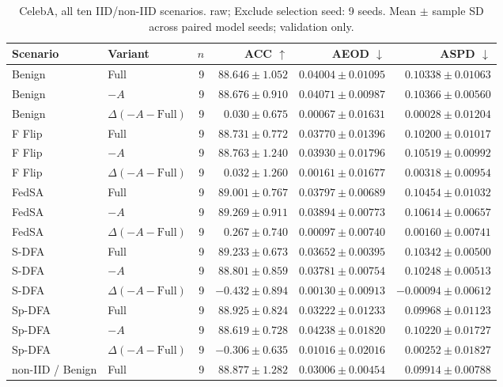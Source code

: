 \begin{table}[t]
\centering
\small
\caption{CelebA, all ten IID/non-IID scenarios. raw; Exclude selection seed: 9 seeds. Mean $\pm$ sample SD across paired model seeds; validation only.}
\begin{tabular}{llrrrr}
\toprule
Scenario & Variant & $n$ & ACC $\uparrow$ & AEOD $\downarrow$ & ASPD $\downarrow$ \\
\midrule
Benign & Full & 9 & $88.646 \pm 1.052$ & $0.04004 \pm 0.01095$ & $0.10338 \pm 0.01063$ \\
Benign & $-A$ & 9 & $88.676 \pm 0.910$ & $0.04071 \pm 0.00987$ & $0.10366 \pm 0.00560$ \\
Benign & $\Delta(-A-\mathrm{Full})$ & 9 & $0.030 \pm 0.675$ & $0.00067 \pm 0.01631$ & $0.00028 \pm 0.01204$ \\
F Flip & Full & 9 & $88.731 \pm 0.772$ & $0.03770 \pm 0.01396$ & $0.10200 \pm 0.01017$ \\
F Flip & $-A$ & 9 & $88.763 \pm 1.240$ & $0.03930 \pm 0.01796$ & $0.10519 \pm 0.00992$ \\
F Flip & $\Delta(-A-\mathrm{Full})$ & 9 & $0.032 \pm 1.260$ & $0.00161 \pm 0.01677$ & $0.00318 \pm 0.00954$ \\
FedSA & Full & 9 & $89.001 \pm 0.767$ & $0.03797 \pm 0.00689$ & $0.10454 \pm 0.01032$ \\
FedSA & $-A$ & 9 & $89.269 \pm 0.911$ & $0.03894 \pm 0.00773$ & $0.10614 \pm 0.00657$ \\
FedSA & $\Delta(-A-\mathrm{Full})$ & 9 & $0.267 \pm 0.740$ & $0.00097 \pm 0.00740$ & $0.00160 \pm 0.00741$ \\
S-DFA & Full & 9 & $89.233 \pm 0.673$ & $0.03652 \pm 0.00395$ & $0.10342 \pm 0.00500$ \\
S-DFA & $-A$ & 9 & $88.801 \pm 0.859$ & $0.03781 \pm 0.00754$ & $0.10248 \pm 0.00513$ \\
S-DFA & $\Delta(-A-\mathrm{Full})$ & 9 & $-0.432 \pm 0.894$ & $0.00130 \pm 0.00913$ & $-0.00094 \pm 0.00612$ \\
Sp-DFA & Full & 9 & $88.925 \pm 0.824$ & $0.03222 \pm 0.01233$ & $0.09968 \pm 0.01123$ \\
Sp-DFA & $-A$ & 9 & $88.619 \pm 0.728$ & $0.04238 \pm 0.01820$ & $0.10220 \pm 0.01727$ \\
Sp-DFA & $\Delta(-A-\mathrm{Full})$ & 9 & $-0.306 \pm 0.635$ & $0.01016 \pm 0.02016$ & $0.00252 \pm 0.01827$ \\
non-IID / Benign & Full & 9 & $88.877 \pm 1.282$ & $0.03006 \pm 0.00454$ & $0.09914 \pm 0.00788$ \\

\end{tabular}
\end{table}
